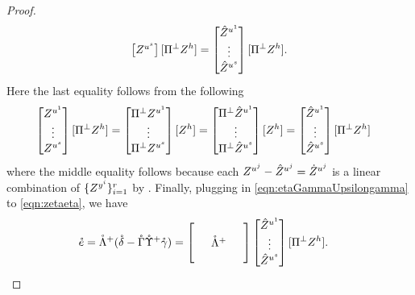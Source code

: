 \documentclass[main.tex]{subfiles}
\begin{document}
\begin{proof}
\begin{align}
\begin{bmatrix}
           Z^{\ume^s}
        \end{bmatrix}
        [\Pi^\perp  Z^{h}]
      =
        \begin{bmatrix}
          \Zhat^{\ume^1}\\
          \vdots\\
          \Zhat^{\ume^s}
        \end{bmatrix}
        [\Pi^\perp  Z^{h}]
        .
        \label{eqn:etaGammaUpsilongamma}
    \end{align}
  Here the last equality follows from the following
  \begin{align*}
    \begin{bmatrix}
       Z^{u^1}\\
      \vdots\\
       Z^{u^s}
    \end{bmatrix}
    [\Pi^\perp
     Z^{h}]
    &=
      \begin{bmatrix}
        \Pi^\perp  Z^{u^1}\\
        \vdots\\
        \Pi^\perp  Z^{u^s}
      \end{bmatrix}
       [Z^{h}]
    =
      \begin{bmatrix}
        \Pi^\perp \hat Z^{u^1}\\
        \vdots\\
        \Pi^\perp \hat Z^{u^s}
      \end{bmatrix}
       [Z^{h}]
    =
      \begin{bmatrix}
        \hat Z^{u^1}\\
        \vdots\\
        \hat Z^{u^s}
      \end{bmatrix}
      [\Pi^\perp
       Z^{h}]
  \end{align*}
  where the middle equality follows because each $ Z^{u^j} - \hat Z^{u^j} = \dot Z^{u^j}$ is a linear combination of $ \{Z^{y^i}\}_{i=1}^r$ by .
  Finally, plugging in \cref{eqn:etaGammaUpsilongamma} to \cref{eqn:zetaeta}, we have
  \begin{align*}
    \mathring{\eme}
      &=
        \mathring{\Lambdame }^+(\mathring{\deltame} - \mathring \Gamma \mathring  {\Upsilonme }^+ \mathring{\gammame})
      =
        \begin{bmatrix}
        \phz
          &\phz
            &\phz\\
        \phz
          &\mathring{\Lambdame }^+
            &\phz\\
        \phz
          &\phz
            &\phz
        \end{bmatrix}
        \begin{bmatrix}
          \Zhat^{\ume^1}\\
          \vdots\\
          \Zhat^{\ume^s}
        \end{bmatrix}
        [\Pi^\perp  Z^{h}]
        .
  \end{align*}
  \end{proof}
  
\end{document}
